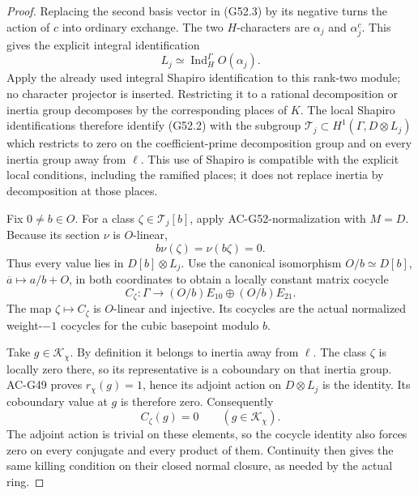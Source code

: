 \begin{proof}
Replacing the second basis vector in (G52.3) by its
negative turns the action of $c$ into ordinary exchange.
The two $H$-characters are $\alpha_j$ and $\alpha_j^c$.
This gives the explicit integral identification
\[
                  L_j\simeq\operatorname{Ind}_{H}^{\Gamma}
                                      O(\alpha_j).            \tag{G52.10}
\]
Apply the already used integral Shapiro identification
to this rank-two module; no character projector is
inserted.  Restricting it to a rational decomposition
or inertia group decomposes by the corresponding
places of $K$.  The local Shapiro identifications
therefore identify (G52.2) with the subgroup
$\mathcal T_j\subset H^1(\Gamma,D\otimes L_j)$ which
restricts to zero on the coefficient-prime decomposition
group and on every inertia group away from $\ell$.
This use of Shapiro is compatible with the explicit
local conditions, including the ramified places; it
does not replace inertia by decomposition at those
places.

Fix $0\ne b\in O$.
For a class $\zeta\in\mathcal T_j[b]$, apply
AC-G52-normalization with $M=D$.
Because its section $\nu$ is $O$-linear,
\[
                        b\nu(\zeta)=\nu(b\zeta)=0.
                                                               \tag{G52.11}
\]
Thus every value lies in $D[b]\otimes L_j$.
Use the canonical isomorphism
$O/b\simeq D[b]$, $\overline a\mapsto a/b+O$, in
both coordinates to obtain a locally constant matrix
cocycle
\[
 C_\zeta:\Gamma\longrightarrow
       (O/b)E_{10}\oplus(O/b)E_{21}.                          \tag{G52.12}
\]
The map $\zeta\mapsto C_\zeta$ is $O$-linear and
injective.  Its cocycles are the actual normalized
weight-$-1$ cocycles for the cubic basepoint modulo $b$.

Take $g\in\mathcal K_\chi$.
By definition it belongs to inertia away from $\ell$.
The class $\zeta$ is locally zero there, so its
representative is a coboundary on that inertia group.
AC-G49 proves $r_\chi(g)=1$, hence its adjoint action
on $D\otimes L_j$ is the identity.
Its coboundary value at $g$ is therefore zero.
Consequently
\[
                        C_\zeta(g)=0
                           \qquad(g\in\mathcal K_\chi).     \tag{G52.13}
\]
The adjoint action is trivial on these elements, so
the cocycle identity also forces zero on every conjugate
and every product of them.  Continuity then gives the
same killing condition on their closed normal closure,
as needed by the actual ring.


\end{proof}
